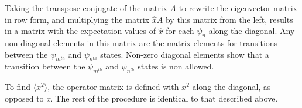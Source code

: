\documentclass[%
 reprint,
 amsmath,amssymb,
 aps,
]{revtex4-1}
\begin{document}
Taking the transpose conjugate of the matrix \textit{A} to rewrite the eigenvector matrix in row form, and multiplying the matrix $\hat{x}A$ by this matrix from the left, results in a matrix with the expectation values of $\hat{x}$ for each $\psi_n$ along the diagonal.  Any non-diagonal elements in this matrix are the matrix elements for transitions between the $\psi_{m^{th}}$ and $\psi_{n^{th}}$ states.  Non-zero diagonal elements show that a transition between the $\psi_{m^{th}}$ and $\psi_{n^{th}}$ states is non allowed.

To find $\langle x^2 \rangle$, the operator matrix is defined with $x^2$ along the diagonal, as opposed to \textit{x}.  The rest of the procedure is identical to that described above.
\end{document}
